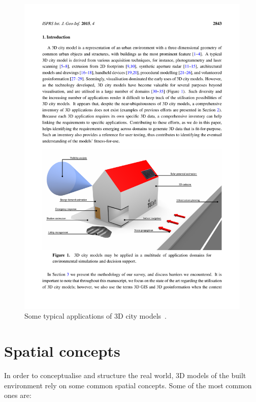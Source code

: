 \begin{figure}
\centering
\includegraphics[width=\linewidth]{figs/applications.pdf}
\caption{Some typical applications of 3D city models~\citep{Biljecki15a}.}%
\label{fig:applications}
\end{figure}

\section{Spatial concepts}

In order to conceptualise and structure the real world, 3D models of the built environment rely on some common spatial concepts.
Some of the most common ones are:

